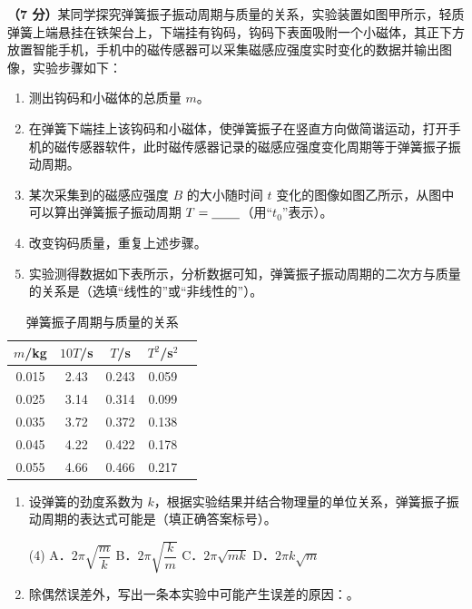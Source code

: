 \begin{question}
\textbf{（7 分）}某同学探究弹簧振子振动周期与质量的关系，实验装置如图甲所示，轻质弹簧上端悬挂在铁架台上，下端挂有钩码，钩码下表面吸附一个小磁体，其正下方放置智能手机，手机中的磁传感器可以采集磁感应强度实时变化的数据并输出图像，实验步骤如下：


\begin{enumerate}[leftmargin=2em, label=(\arabic*)]
  \item 测出钩码和小磁体的总质量 $m$。
  \item 在弹簧下端挂上该钩码和小磁体，使弹簧振子在竖直方向做简谐运动，打开手机的磁传感器软件，此时磁传感器记录的磁感应强度变化周期等于弹簧振子振动周期。
  \item 某次采集到的磁感应强度 $B$ 的大小随时间 $t$ 变化的图像如图乙所示，从图中可以算出弹簧振子振动周期 $T=\underline{\hspace{2.2em}}$（用“$t_{0}$”表示）。


  \item 改变钩码质量，重复上述步骤。
  \item 实验测得数据如下表所示，分析数据可知，弹簧振子振动周期的二次方与质量的关系是\gkblank（选填“线性的”或“非线性的”）。
\end{enumerate}

\begin{table}[ht]
\centering
\caption{弹簧振子周期与质量的关系}
\small
\begin{tabular}{ccccc}
\toprule
$m$/kg & $10T$/s & $T$/s & $T^{2}$/s$^{2}$\\
\midrule
0.015 & 2.43 & 0.243 & 0.059\\
0.025 & 3.14 & 0.314 & 0.099\\
0.035 & 3.72 & 0.372 & 0.138\\
0.045 & 4.22 & 0.422 & 0.178\\
0.055 & 4.66 & 0.466 & 0.217\\
\bottomrule
\end{tabular}
\end{table}

\begin{enumerate}[leftmargin=2em, label=(\arabic*), start=6]
  \item 设弹簧的劲度系数为 $k$，根据实验结果并结合物理量的单位关系，弹簧振子振动周期的表达式可能是\gkblank（填正确答案标号）。

  \begin{gkopts}(4)
    \task A．$2\pi\sqrt{\dfrac{m}{k}}$
    \task B．$2\pi\sqrt{\dfrac{k}{m}}$
    \task C．$2\pi\sqrt{mk}$
    \task D．$2\pi k\sqrt{m}$
  \end{gkopts}
  \item 除偶然误差外，写出一条本实验中可能产生误差的原因：\gkblank。
\end{enumerate}
\end{question}

